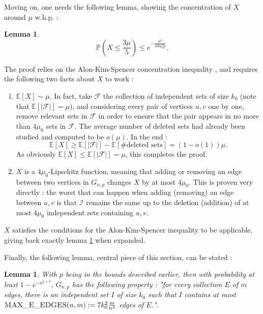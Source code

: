 \documentclass[10pt,journal,a4paper]{IEEEtran}
\newtheorem{lemma}[theorem]{Lemma}
\theoremstyle{definition}   %
\begin{document}
Moving on, one needs the following lemma, showing the concentration of $X$ around $\mu$ w.h.p. :

\begin{lemma}
	$$
	\mathbb{P}(X \leq \frac{3\mu}{5}) \leq e^{- \frac{\mu^2}{300 \mu_0^2 p}}.
	$$ 
	\label{lma:X_concentration}
\end{lemma}

The proof relies on the Alon-Kim-Spencer concentration inequality \cite{alon_concentration}, and requires the following two facts about $X$ to work :
\begin{enumerate}
	\item $\mathbb{E}\left[ X \right] \sim \mu$. In fact, take $\mathcal{F}$ the collection of independent sets of size $k_0$ (note that $\mathbb{E}\left[ \lvert \mathcal{F} \rvert  \right] = \mu$), and considering every pair of vertices $u,v $ one by one, remove relevant sets in $\mathcal{F}$ in order to ensure that the pair appears in no more than $4\mu_0$ sets in $\mathcal{F}$. The average number of deleted sets had already been studied \cite{X_mean} and computed to be $o(\mu)$. In the end :
		$$
		\mathbb{E}\left[ X \right] \ge \mathbb{E}\left[ \lvert \mathcal{F} \rvert  \right] - \mathbb{E}\left[ \# \text{deleted sets} \right] = (1 - o(1))\mu.
		$$
		As obviously $\mathbb{E}\left[ X \right] \leq \mathbb{E}\left[ \lvert \mathcal{F} \rvert  \right] = \mu$, this completes the proof.
	\item $X$ is a $4\mu_0$-Lipschitz function, meaning that adding or removing an edge between two vertices in $G_{n, p}$ changes $X$ by at most $4\mu_0$. This is proven very directly : the worst that can happen when adding (removing) an edge between $u, v$ is that $\mathcal{I}$ remains the same up to the deletion (addition) of at most $4\mu_0$ independent sets containing $u, v$.

\end{enumerate}

$X$ satisfies the conditions for the Alon-Kim-Spencer inequality to be applicable, giving back exactly lemma \ref{lma:X_concentration} when expanded.

Finally, the following lemma, central piece of this section, can be stated :
\begin{lemma}
With $p$ being in the bounds described earlier, then with probability at least $ 1 - e^{-n^{1+\delta}}$, $G_{n, p}$ has the following property : "for every collection $E$ of $m$ edges, there is an independent set $I$ of size $k_0$ such that $I$ contains at most $\textsc{MAX\_E\_EDGES}(n, m) := 7 k_0^2 \frac{m}{n^2 }$ edges of $E$.".
	 \label{lma:two_four}
\end{lemma}
\end{document}
